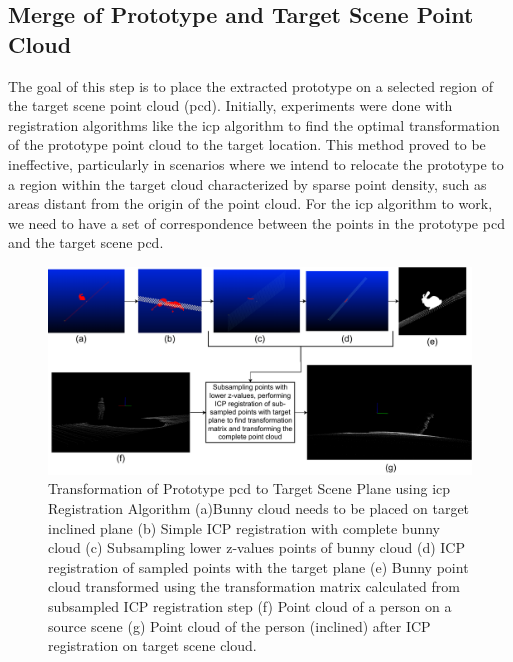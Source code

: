 \subsection{Merge of Prototype and Target Scene Point Cloud}
The goal of this step is to place the extracted prototype on a selected region of the target scene point cloud (\acrshort{pcd}). Initially, experiments were done with registration algorithms like the \acrfull{icp} algorithm to find the optimal transformation of the prototype point cloud to the target location. This method proved to be ineffective, particularly in scenarios where we intend to relocate the prototype to a region within the target cloud characterized by sparse point density, such as areas distant from the origin of the point cloud. For the \acrshort{icp} algorithm to work, we need to have a set of correspondence between the points in the prototype \acrshort{pcd} and the target scene \acrshort{pcd}. 

\begin{figure}[htbp]
    \centering
    \includegraphics[width=1\linewidth]{97_graphics/concepts/icp_registration_analysis.pdf}
    \caption[Transformation of Prototype \acrshort{pcd} to Target Scene Plane using \acrshort{icp} Registration Algorithm.]{Transformation of Prototype \acrshort{pcd} to Target Scene Plane using \acrshort{icp} Registration Algorithm (a)Bunny cloud needs to be placed on target inclined plane (b) Simple ICP registration with complete bunny cloud (c) Subsampling lower z-values points of bunny cloud (d) ICP registration of sampled points with the target plane (e) Bunny point cloud transformed using the transformation matrix calculated from subsampled ICP registration step (f) Point cloud of a person on a source scene (g) Point cloud of the person (inclined) after ICP registration on target scene cloud.} 
    \label{fig:icp_registration_analaysis}
\end{figure}

